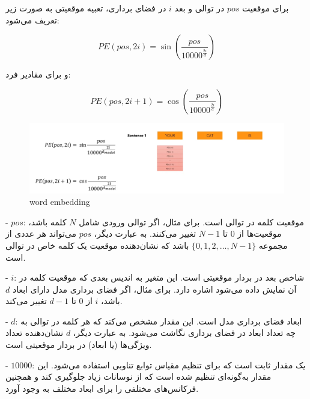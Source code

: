 برای موقعیت \( pos \) در توالی و بعد \( i \) در فضای برداری، تعبیه موقعیتی به صورت زیر تعریف می‌شود:

\[
PE(pos, 2i) = \sin\left( \frac{pos}{10000^{\frac{2i}{d}}} \right)
\]

و برای مقادیر فرد:

\[
PE(pos, 2i+1) = \cos\left( \frac{pos}{10000^{\frac{2i}{d}}} \right)
\]







\begin{figure}[h]
	\centering
	\begin{minipage}[b]{0.7\textwidth}
		\centering
		\includegraphics[width=\textwidth]{transformer_images/positional_embedding_formula .png}
		\caption{word embedding}
		\label{fig:positional embedding}
	\end{minipage}
	\hfill
	
\end{figure}





- \( pos \): موقعیت کلمه در توالی است. برای مثال، اگر توالی ورودی شامل \( N \) کلمه باشد، موقعیت‌ها از \( 0 \) تا \( N-1 \) تغییر می‌کنند. به عبارت دیگر، \( pos \) می‌تواند هر عددی از مجموعه \( \{0, 1, 2, \dots, N-1\} \) باشد که نشان‌دهنده موقعیت یک کلمه خاص در توالی است.

- \( i \): شاخص بعد در بردار موقعیتی است. این متغیر به اندیس بعدی که موقعیت کلمه در آن نمایش داده می‌شود اشاره دارد. برای مثال، اگر فضای برداری مدل دارای ابعاد \( d \) باشد، \( i \) از \( 0 \) تا \( d-1 \) تغییر می‌کند.

- \( d \): ابعاد فضای برداری مدل است. این مقدار مشخص می‌کند که هر کلمه در توالی به چه تعداد ابعاد در فضای برداری نگاشت می‌شود. به عبارت دیگر، \( d \) نشان‌دهنده تعداد ویژگی‌ها (یا ابعاد) در بردار موقعیتی است.

- \( 10000 \): یک مقدار ثابت است که برای تنظیم مقیاس توابع تناوبی استفاده می‌شود. این مقدار به‌گونه‌ای تنظیم شده است که از نوسانات زیاد جلوگیری کند و همچنین فرکانس‌های مختلفی را برای ابعاد مختلف به وجود آورد.


